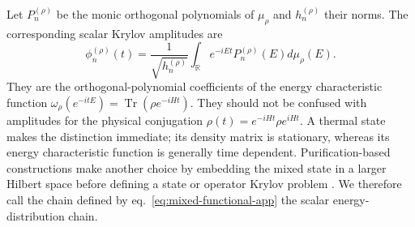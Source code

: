 \documentclass[a4paper,11pt]{article}
\def\dd{d}%
\def\ii{i}%
\def\ee{e}%
\theoremstyle{definition}
\theoremstyle{remark}
\newcommand{\dd}{\mathrm d}
\newcommand{\ii}{\mathrm i}
\newcommand{\ee}{\mathrm e}
\newcommand{\RR}{\mathbb R}
\begin{document}
Let $P_n^{(\rho)}$ be the monic orthogonal polynomials of $\mu_\rho$ and
$h_n^{(\rho)}$ their norms.  The corresponding scalar Krylov amplitudes
are
\begin{equation}
   \phi_n^{(\rho)}(t)=
   \frac{1}{\sqrt{h_n^{(\rho)}}}
   \int_{\RR}\ee^{-\ii Et}P_n^{(\rho)}(E)\dd\mu_\rho(E).
   \label{eq:mixed-scalar-amplitudes-app}
\end{equation}
They are the orthogonal-polynomial coefficients of the energy
characteristic function
$\omega_\rho(\ee^{-\ii tE})=\operatorname{Tr}(\rho\ee^{-\ii Ht})$.
They should not be confused with amplitudes for the physical conjugation
$\rho(t)=\ee^{-\ii Ht}\rho\ee^{\ii Ht}$.  A thermal state makes the
distinction immediate; its density matrix is stationary, whereas its
energy characteristic function is generally time dependent.
Purification-based constructions make another choice by embedding the
mixed state in a larger Hilbert space before defining a state or operator
Krylov problem \cite{DasMori2024}.  We therefore call the chain defined
by eq.~\eqref{eq:mixed-functional-app} the scalar energy-distribution
chain.
\end{document}

